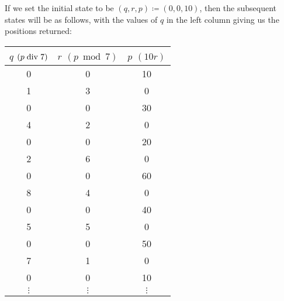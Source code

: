 \documentclass[Book-Poly]{subfiles}
\begin{document}
\begin{exercise}
\begin{solution}
\begin{enumerate}
    If we set the initial state to be $(q,r,p)\coloneqq(0,0,10)$, then the subsequent states will be as follows, with the values of $q$ in the left column giving us the positions returned:
    \begin{table}[hbt!]
        \centering
        \footnotesize
        \begin{tabular}{c|c|c}
            $q$ $(p\bdiv7)$ & $r$ $(p\bmod7)$ & $p$ $(10r)$ \\
            \hline
            0 & 0 & 10 \\
            1 & 3 & 0 \\
            0 & 0 & 30 \\
            4 & 2 & 0 \\
            0 & 0 & 20 \\
            2 & 6 & 0 \\
            0 & 0 & 60 \\
            8 & 4 & 0 \\
            0 & 0 & 40 \\
            5 & 5 & 0 \\
            0 & 0 & 50 \\
            7 & 1 & 0 \\
            0 & 0 & 10 \\
            $\vdots$ & $\vdots$ & $\vdots$
        \end{tabular}
    \end{table}
\end{enumerate}
\end{solution}
\end{exercise}
\end{document}
